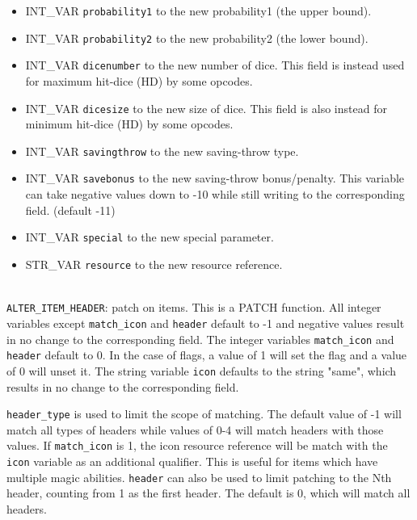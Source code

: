 \documentclass{article}
\begin{document}
\begin{itemize}
\item INT_VAR \verb+probability1+ to the new probability1 (the upper bound).
\item INT_VAR \verb+probability2+ to the new probability2 (the lower bound).
\item INT_VAR \verb+dicenumber+ to the new number of dice. This field is instead used for maximum hit-dice (HD) by some opcodes.
\item INT_VAR \verb+dicesize+ to the new size of dice. This field is also instead for minimum hit-dice (HD) by some opcodes.
\item INT_VAR \verb+savingthrow+ to the new saving-throw type.
\item INT_VAR \verb+savebonus+ to the new saving-throw bonus/penalty. This variable can take negative values down to -10 while still writing to the corresponding field. (default -11)
\item INT_VAR \verb+special+ to the new special parameter.
\item STR_VAR \verb+resource+ to the new resource reference.
\end{itemize}
\\

\verb+ALTER_ITEM_HEADER+: patch  on items. This is a PATCH function. All integer variables except \verb+match_icon+ and \verb+header+ default to -1 and negative values result in no change to the corresponding field. The integer variables \verb+match_icon+ and \verb+header+ default to 0. In the case of flags, a value of 1 will set the flag and a value of 0 will unset it. The string variable \verb+icon+ defaults to the string "same", which results in no change to the corresponding field.

\verb+header_type+ is used to limit the scope of matching. The default value of -1 will match all types of headers while values of 0-4 will match headers with those values. If \verb+match_icon+ is 1, the icon resource reference will be match with the \verb+icon+ variable as an additional qualifier. This is useful for items which have multiple magic abilities. \verb+header+ can also be used to limit patching to the Nth header, counting from 1 as the first header. The default is 0, which will match all headers.
\end{document}
